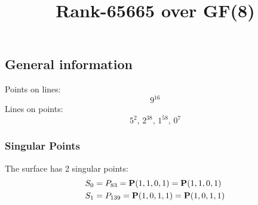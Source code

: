 \documentclass{article}
\newcommand\setTBstruts{\def\T{\rule{0pt}{2.6ex}}%
\def\B{\rule[-1.2ex]{0pt}{0pt}}}
\newcommand{\bP}{{\bf P}}
\begin{document}
 
\setTBstruts



{\allowdisplaybreaks%






\title{Rank-65665 over GF(8)}
\author{}%
\maketitle%
%
{}



\subsection*{General information}
Points on lines:
$$
9^{16}$$
Lines on points:
$$
5^2,\,2^{38},\,1^{58},\,0^7$$
\subsubsection*{Singular Points}
The surface has 2 singular points:\\
\begin{align*}
S_{0} &= P_{83}=\bP(1, 1, 0, 1) = \bP(1, 1, 0, 1)\\
S_{1} &= P_{139}=\bP(1, 0, 1, 1) = \bP(1, 0, 1, 1)\\
\end{align*}
}
\end{document}
